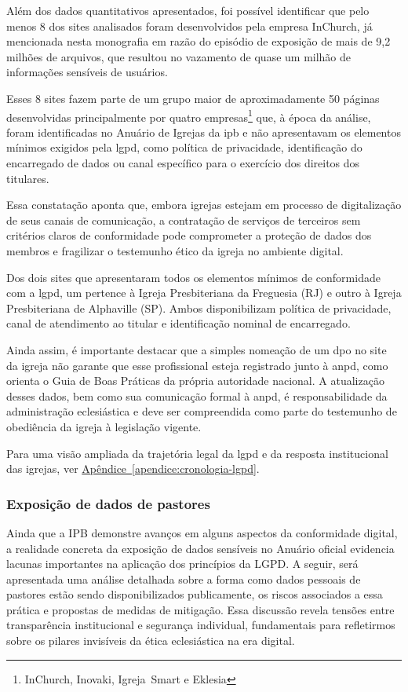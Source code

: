 Além dos dados quantitativos apresentados, foi possível identificar que pelo menos 8 dos sites analisados foram desenvolvidos pela empresa \mbox{InChurch}, já mencionada nesta monografia em razão do episódio de exposição de mais de 9,2 milhões de arquivos, que resultou no vazamento de quase um milhão de informações sensíveis de usuários\cite{almeida_inchurch_2024}.

Esses 8 sites fazem parte de um grupo maior de aproximadamente 50 páginas desenvolvidas principalmente por quatro empresas\footnote{\mbox{InChurch}, \mbox{Inovaki}, \mbox{Igreja Smart} e \mbox{Eklesia}} que, à época da análise, foram identificadas no Anuário de Igrejas da \gls{ipb} e não apresentavam os elementos mínimos exigidos pela \gls{lgpd}, como política de privacidade, identificação do encarregado de dados ou canal específico para o exercício dos direitos dos titulares.

Essa constatação aponta que, embora igrejas estejam em processo de digitalização de seus canais de comunicação, a contratação de serviços de terceiros sem critérios claros de conformidade pode comprometer a proteção de dados dos membros e fragilizar o testemunho ético da igreja no ambiente digital.

Dos dois sites que apresentaram todos os elementos mínimos de conformidade com a \gls{lgpd}, um pertence à Igreja Presbiteriana da Freguesia (RJ) e outro à Igreja Presbiteriana de Alphaville (SP). Ambos disponibilizam política de privacidade, canal de atendimento ao titular e identificação nominal de encarregado.

Ainda assim, é importante destacar que a simples nomeação de um \gls{dpo} no site da igreja não garante que esse profissional esteja registrado junto à \gls{anpd}, como orienta o Guia de Boas Práticas da própria autoridade nacional. A atualização desses dados, bem como sua comunicação formal à \gls{anpd}, é responsabilidade da administração eclesiástica e deve ser compreendida como parte do testemunho de obediência da igreja à legislação vigente.

Para uma visão ampliada da trajetória legal da \gls{lgpd} e da resposta institucional das igrejas, ver \hyperref[apendice:cronologia-lgpd]{Apêndice~\ref*{apendice:cronologia-lgpd}}.

\subsubsection{Exposição de dados de pastores}

Ainda que a IPB demonstre avanços em alguns aspectos da conformidade digital, a realidade concreta da exposição de dados sensíveis no Anuário oficial evidencia lacunas importantes na aplicação dos princípios da LGPD. A seguir, será apresentada uma análise detalhada sobre a forma como dados pessoais de pastores estão sendo disponibilizados publicamente, os riscos associados a essa prática e propostas de medidas de mitigação. Essa discussão revela tensões entre transparência institucional e segurança individual, fundamentais para refletirmos sobre os pilares invisíveis da ética eclesiástica na era digital.

